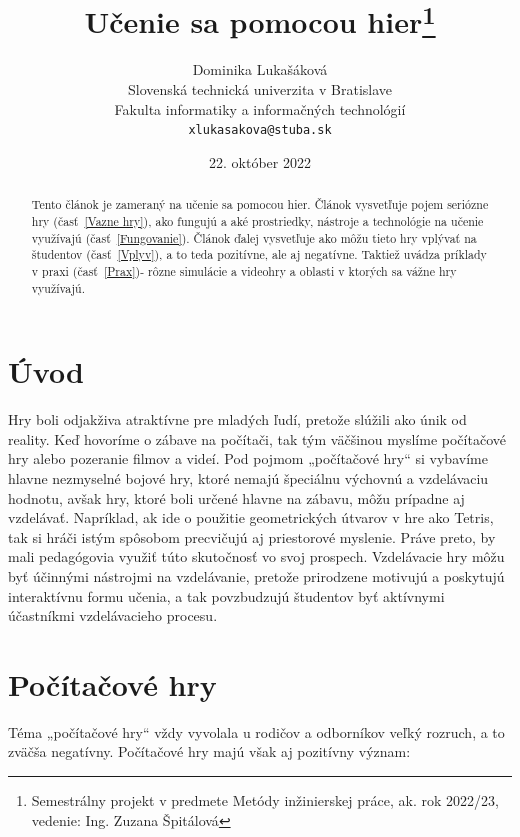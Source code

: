 \documentclass[10pt,twoside,slovak,a4paper]{article}
\title{Učenie sa pomocou hier\thanks{Semestrálny projekt v predmete Metódy inžinierskej práce, ak. rok 2022/23, vedenie: Ing. Zuzana Špitálová}}
\author{Dominika Lukašáková\\[2pt]
	{\small Slovenská technická univerzita v Bratislave}\\
	{\small Fakulta informatiky a informačných technológií}\\
	{\small \texttt{xlukasakova@stuba.sk}}
	}
\date{\small 22. október 2022}
\begin{document}
\maketitle

\begin{abstract}
Tento článok je zameraný na učenie sa pomocou hier. Článok vysvetľuje pojem seriózne hry (časť~\ref{Vazne hry}), ako fungujú a aké prostriedky, nástroje a technológie na učenie využívajú (časť~\ref{Fungovanie}). Článok ďalej vysvetľuje ako môžu tieto hry vplývať na študentov (časť~\ref{Vplyv}), a to teda pozitívne, ale aj negatívne. Taktiež uvádza príklady v praxi (časť~\ref{Prax})- rôzne simulácie a videohry a oblasti v ktorých sa vážne hry využívajú. 
\end{abstract}



\section{Úvod}


Hry boli odjakživa atraktívne pre mladých ľudí, pretože slúžili ako únik od reality. Keď hovoríme o zábave na počítači, tak tým väčšinou myslíme počítačové hry alebo pozeranie filmov a videí. Pod pojmom „počítačové hry“ si vybavíme hlavne nezmyselné bojové hry, ktoré nemajú špeciálnu výchovnú a vzdelávaciu hodnotu, avšak hry, ktoré boli určené hlavne na zábavu, môžu prípadne aj vzdelávať. Napríklad, ak ide o použitie geometrických útvarov v hre ako Tetris, tak si hráči istým spôsobom precvičujú aj priestorové myslenie. Práve preto, by mali pedagógovia využiť túto skutočnosť vo svoj prospech. Vzdelávacie hry môžu byť účinnými nástrojmi na vzdelávanie, pretože prirodzene motivujú a poskytujú interaktívnu formu učenia, a tak povzbudzujú študentov byť aktívnymi účastníkmi vzdelávacieho procesu. 

\vspace{5mm} %

\emph{} \cite{Gee}

\newpage

\section{Počítačové hry}


Téma „počítačové hry“ vždy vyvolala u rodičov a odborníkov veľký rozruch, a to zväčša negatívny. Počítačové hry majú však aj pozitívny význam:   
\end{document}
